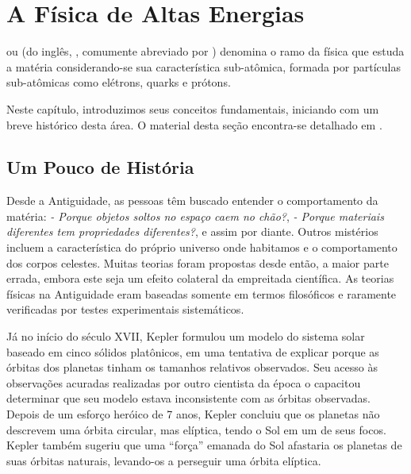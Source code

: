\typeout{ ====================================================================}
\typeout{ ====================================================================}

\chapter{A Física de Altas Energias}
\label{chap:introducao}

 ou  (do inglês,
, comumente abreviado por ) denomina o
ramo da física que estuda a matéria considerando-se sua característica
sub-atômica, formada por partículas sub-atômicas como elétrons, quarks e
prótons.

Neste capítulo, introduzimos seus conceitos fundamentais, iniciando com um
breve histórico desta área. O material desta seção encontra-se detalhado em
\cite{partadv}.


\section{Um Pouco de História}

Desde a Antiguidade, as pessoas têm buscado entender o comportamento da
matéria: \textit{- Porque objetos soltos no espaço caem no chão?}, \textit{-
Porque materiais diferentes tem propriedades diferentes?}, e assim por
diante. Outros mistérios incluem a característica do próprio universo onde
habitamos e o comportamento dos corpos celestes. Muitas teorias foram
propostas desde então, a maior parte errada, embora este seja um efeito
colateral da empreitada científica. As teorias físicas na Antiguidade eram
baseadas somente em termos filosóficos e raramente verificadas por testes
experimentais sistemáticos.

Já no início do século XVII, Kepler formulou um modelo do sistema solar
baseado em cinco sólidos platônicos, em uma tentativa de explicar porque as
órbitas dos planetas tinham os tamanhos relativos observados. Seu acesso às
observações acuradas realizadas por outro cientista da época o capacitou
determinar que seu modelo estava inconsistente com as órbitas
observadas. Depois de um esforço heróico de 7 anos, Kepler concluiu que os
planetas não descrevem uma órbita circular, mas elíptica, tendo o Sol em um de
seus focos. Kepler também sugeriu que uma ``força'' emanada do Sol afastaria
os planetas de suas órbitas naturais, levando-os a perseguir uma órbita
elíptica.

